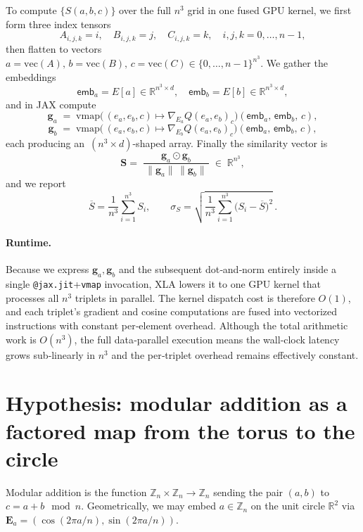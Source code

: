 \documentclass{article} %
\theoremstyle{plain}
\theoremstyle{definition}
\newtheorem{empirical fact}[theorem]{Empirical Fact}
\begin{document}
To compute \(\{S(a,b,c)\}\) over the full \(n^3\) grid in one fused GPU kernel, we
first form three index tensors
\[
A_{i,j,k}=i,\quad B_{i,j,k}=j,\quad C_{i,j,k}=k,
\quad i,j,k=0,\dots,n-1,
\]
then flatten to vectors
\(\displaystyle
a=\mathrm{vec}(A),\,
b=\mathrm{vec}(B),\,
c=\mathrm{vec}(C)
\in\{0,\dots,n-1\}^{n^3}.
\)
We gather the embeddings
\[
\mathsf{emb}_a = E[a]\in\mathbb{R}^{n^3\times d},
\quad
\mathsf{emb}_b = E[b]\in\mathbb{R}^{n^3\times d},
\]
and in JAX compute
\[
\mathbf{g}_a \;=\;\mathrm{vmap}\!\bigl(\,(e_a,e_b,c)\mapsto \nabla_{E_a}Q(e_a,e_b)_c\bigr)
                   (\mathsf{emb}_a,\,\mathsf{emb}_b,\,c),
\]
\[
\mathbf{g}_b \;=\;\mathrm{vmap}\!\bigl(\,(e_a,e_b,c)\mapsto \nabla_{E_b}Q(e_a,e_b)_c\bigr)
                   (\mathsf{emb}_a,\,\mathsf{emb}_b,\,c),
\]
each producing an \(\,(n^3\times d)\)-shaped array.  Finally the similarity vector is
\[
\mathbf{S}
=\;\frac{\mathbf{g}_a \odot \mathbf{g}_b}
        {\,\|\mathbf{g}_a\|\,\|\mathbf{g}_b\|\,}
\;\in\;\mathbb{R}^{n^3},
\]
and we report
\[
\overline{S}
=\frac{1}{n^3}\sum_{i=1}^{n^3}S_i,
\qquad
\sigma_S
=\sqrt{\frac{1}{n^3}\sum_{i=1}^{n^3}\bigl(S_i-\overline{S}\bigr)^2}\,. 
\]

\paragraph{Runtime.}%
Because we express \(\mathbf{g}_a,\mathbf{g}_b\) and the subsequent
dot‑and‑norm entirely inside a single
\texttt{@jax.jit}+\;\texttt{vmap} invocation, XLA lowers it to one GPU kernel
that processes all \(n^3\) triplets in parallel.  The kernel dispatch cost
is therefore \(O(1)\), and each triplet’s gradient and cosine computations
are fused into vectorized instructions with constant per‑element overhead.
Although the total arithmetic work is \(O(n^3)\), the full data‑parallel
execution means the wall‑clock latency grows sub‑linearly in \(n^3\)
and the per‑triplet overhead remains effectively constant. 








\section{Hypothesis: modular addition as a factored map from the torus to the circle}\label{app:hypothesis}




Modular addition is the function $\mathbb{Z}_n\times \mathbb{Z}_n\to \mathbb{Z}_n$ sending the pair $(a,b)$ to $c=a+b\mod n$.
Geometrically, we may embed $a\in \mathbb{Z}_n$ on the unit circle $\mathbb{R}^2$ via $\mathbf{E}_a=(\cos(2\pi a/n), \sin(2\pi a/n))$.
\end{document}
